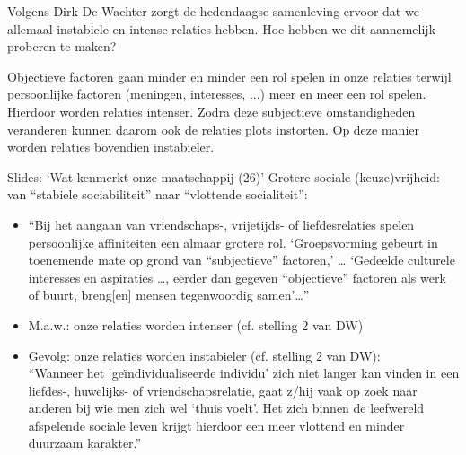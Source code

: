 \documentclass[main.tex]{subfiles}
\begin{document}
\begin{examenvraag}
    \begin{vraag}
        Volgens Dirk De Wachter zorgt de hedendaagse samenleving ervoor dat we allemaal instabiele en intense relaties hebben. Hoe hebben we dit aannemelijk proberen te maken?
    \end{vraag}

    \begin{antwoord}
        Objectieve factoren gaan minder en minder een rol spelen in onze relaties terwijl persoonlijke factoren (meningen, interesses, ...) meer en meer een rol spelen.
        Hierdoor worden relaties intenser.
        Zodra deze subjectieve omstandigheden veranderen kunnen daarom ook de relaties plots instorten.
        Op deze manier worden relaties bovendien instabieler.
        \begin{citaat}{Slides: `Wat kenmerkt onze maatschappij (26)'}
            Grotere sociale (keuze)vrijheid: van “stabiele
            sociabiliteit” naar “vlottende socialiteit”:
            \begin{itemize}
                \item “Bij het aangaan van vriendschaps-, vrijetijds- of liefdesrelaties spelen persoonlijke affiniteiten een almaar grotere rol.
                    ‘Groepsvorming gebeurt in toenemende mate op grond van “subjectieve” factoren,’ … ‘Gedeelde culturele interesses en aspiraties …, eerder dan gegeven “objectieve” factoren als werk of buurt, breng[en] mensen tegenwoordig samen’…”
                \item M.a.w.: onze relaties worden intenser (cf. stelling 2 van DW)\\
                \item Gevolg: onze relaties worden instabieler (cf. stelling 2 van DW):\\
                    “Wanneer het ‘geïndividualiseerde individu’ zich niet langer kan vinden in een liefdes-, huwelijks- of vriendschapsrelatie, gaat z/hij vaak op zoek naar anderen bij wie men zich wel ‘thuis voelt’.
                    Het zich binnen de leefwereld afspelende sociale leven krijgt hierdoor een meer vlottend en minder duurzaam karakter.”
            \end{itemize}
        \end{citaat}
    \end{antwoord}
\end{examenvraag}
\end{document}
